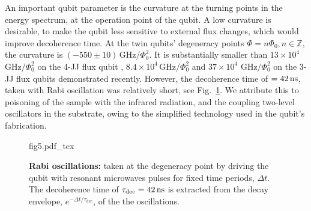 An  important qubit  parameter is  the curvature  at the  turning points  in the
energy  spectrum, at  the operation  point  of the  qubit.  A  low curvature  is
desirable, to  make the  qubit less  sensitive to  external flux  changes, which
would  improve  decoherence  time.   At   the  twin  qubits'  degeneracy  points
$      \Phi     =      n\Phi_0,     n\in\mathbb{Z}      $,     the      curvature     is
$   (-550\pm10)\,\text{GHz}/\Phi_0^2  $.    It   is   substantially  smaller   than
$  13\times  10^4$ $  \text{GHz}/\Phi_0^2$  on  the  4-JJ flux  qubit  \cite{stern2014},
$   8.4  \times   10^4\,   \text{GHz}/\Phi_0^2$  \cite{zhu2010}   and   $  37\times   10^{4}$
$ \text{GHz}/\Phi_0^2$  \cite{gustavsson2012} on the 3-JJ  flux qubits demonstrated
recently.  However,  the decoherence time  of $  = 42\,\text{ns} $,  taken with
Rabi  oscillation   \cite{Bylander2011,Ithier2005,Martinis2003}  was  relatively
short, see  Fig.~\ref{fig:rabi}.  We attribute  this to poisoning of  the sample
with  the infrared  radiation, and  the  coupling two-level  oscillators in  the
substrate, owing to the simplified technology used in the qubit's fabrication.

\begin{figure}[h]
  \centering\def\svgwidth{8cm}{fig5.pdf_tex}
  \caption{\textbf{Rabi oscillations:}  taken at  the degeneracy point  by driving  the qubit
    with resonant microwaves pulses for fixed time periods, $ \Delta t $.  The decoherence time of
    $   \tau_{\text{dec}}  =   42\,\text{ns}  $   is   extracted  from   the  decay   envelope,
    $ e^{-\Delta t/\tau_{\text{dec}}} $, of the the oscillations. \label{fig:rabi}}
\end{figure}

